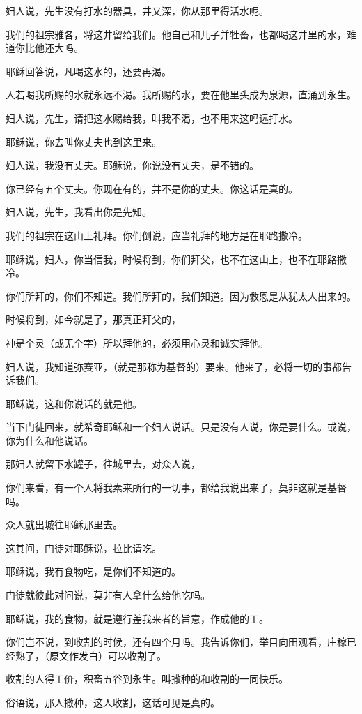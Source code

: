 \documentclass[12pt,oneside]{book}
\begin{document}
妇人说，先生没有打水的器具，井又深，你从那里得活水呢。

我们的祖宗雅各，将这井留给我们。他自己和儿子并牲畜，也都喝这井里的水，难道你比他还大吗。

耶稣回答说，凡喝这水的，还要再渴。

人若喝我所赐的水就永远不渴。我所赐的水，要在他里头成为泉源，直涌到永生。

妇人说，先生，请把这水赐给我，叫我不渴，也不用来这吗远打水。

耶稣说，你去叫你丈夫也到这里来。

妇人说，我没有丈夫。耶稣说，你说没有丈夫，是不错的。

你已经有五个丈夫。你现在有的，并不是你的丈夫。你这话是真的。

妇人说，先生，我看出你是先知。

我们的祖宗在这山上礼拜。你们倒说，应当礼拜的地方是在耶路撒冷。

耶稣说，妇人，你当信我，时候将到，你们拜父，也不在这山上，也不在耶路撒冷。

你们所拜的，你们不知道。我们所拜的，我们知道。因为救恩是从犹太人出来的。

时候将到，如今就是了，那真正拜父的，

神是个灵（或无个字）所以拜他的，必须用心灵和诚实拜他。

妇人说，我知道弥赛亚，（就是那称为基督的）要来。他来了，必将一切的事都告诉我们。

耶稣说，这和你说话的就是他。

当下门徒回来，就希奇耶稣和一个妇人说话。只是没有人说，你是要什么。或说，你为什么和他说话。

那妇人就留下水罐子，往城里去，对众人说，

你们来看，有一个人将我素来所行的一切事，都给我说出来了，莫非这就是基督吗。

众人就出城往耶稣那里去。

这其间，门徒对耶稣说，拉比请吃。

耶稣说，我有食物吃，是你们不知道的。

门徒就彼此对问说，莫非有人拿什么给他吃吗。

耶稣说，我的食物，就是遵行差我来者的旨意，作成他的工。

你们岂不说，到收割的时候，还有四个月吗。我告诉你们，举目向田观看，庄稼已经熟了，（原文作发白）可以收割了。

收割的人得工价，积畜五谷到永生。叫撒种的和收割的一同快乐。

俗语说，那人撒种，这人收割，这话可见是真的。
\end{document}
